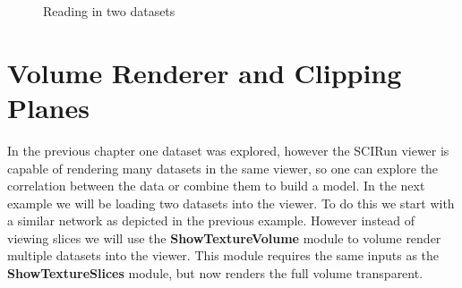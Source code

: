 \documentclass[fleqn,11pt,openany]{book}
\begin{document}
\begin{figure}
\caption{Reading in two datasets}\label{fig:TwoDataSets}
\end{figure}


\section{Volume Renderer and Clipping Planes}

In the previous chapter one dataset was explored, however the SCIRun viewer is capable of rendering many datasets in the same viewer, so one can explore the correlation between the data or combine them to build a model. In the next example we will be loading two datasets into the viewer. To do this we start with a similar network as depicted in the previous example. However instead of viewing slices we will use the {\bf ShowTextureVolume} module to volume render multiple datasets into the viewer. This module requires the same inputs as the {\bf ShowTextureSlices} module, but now renders the full volume transparent.
\end{document}
